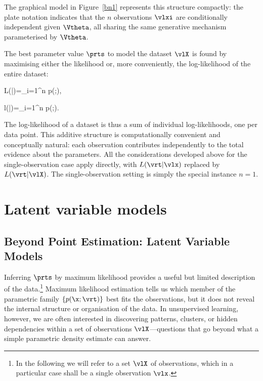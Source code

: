 The graphical model in Figure~\ref{bn1} represents this structure compactly: the plate
notation indicates that the $n$ observations $\vlxi$ are conditionally independent given
$\Vtheta$, all sharing the same generative mechanism parameterised by $\Vtheta$.

The best parameter value $\prts$ to model the dataset $\vlX$ is found by maximising either
the likelihood or, more conveniently, the log-likelihood of the entire dataset:
\begin{myequation}
	L(\vrt|\vlX)=\prod_{i=1}^n p(\vlxi;\Vtheta),
\end{myequation}
\begin{myequation}
	l(\vrt|\vlX)=\sum_{i=1}^n \log p(\vlxi;\Vtheta).
\end{myequation}
The log-likelihood of a dataset is thus a sum of individual log-likelihoods, one per data
point. This additive structure is computationally convenient and conceptually natural: each
observation contributes independently to the total evidence about the parameters. All the
considerations developed above for the single-observation case apply directly, with
$L(\vrt|\vlx)$ replaced by $L(\vrt|\vlX)$. The single-observation setting is simply the
special instance $n=1$.

\section*{Latent variable models}\label{sec:latentmodels}
\subsection*{Beyond Point Estimation: Latent Variable Models}

Inferring $\prts$ by maximum likelihood provides a useful but limited description of the
data.\footnote{In the following we will refer to a set $\vlX$ of observations, which in a
particular case shall be a single observation $\vlx$.} Maximum likelihood estimation tells
us which member of the parametric family $\{p(\x;\vrt)\}$ best fits the observations, but it
does not reveal the internal structure or organisation of the data. In unsupervised learning,
however, we are often interested in discovering patterns, clusters, or hidden dependencies
within a set of observations $\vlX$---questions that go beyond what a simple parametric
density estimate can answer.

